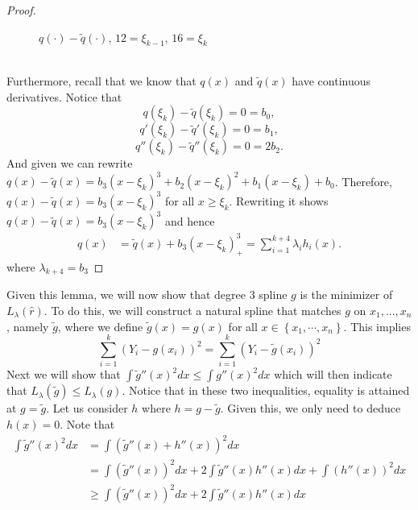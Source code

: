 \begin{proof}
\begin{figure}[!hb]
\begin{center}
			\caption{$q(\cdot) - \widetilde{q}(\cdot)$, $12= \xi_{k-1}$, $16 = \xi_k$}
			\label{fig:regression example}
		\end{center}
	\end{figure}
	\\Furthermore, recall that we know that $q(x)$ and $\widetilde{q}(x)$ have continuous derivatives. Notice that
	\[
	q(\xi_k) - \widetilde{q}(\xi_k) = 0 = b_0,
	\] \[
	q'(\xi_k) - \widetilde{q}'(\xi_k) = 0 = b_1, 
	\] \[
	q''(\xi_k) - \widetilde{q}''(\xi_k) = 0 = 2b_2.
	\]
	And given we can rewrite $q(x) - \widetilde{q}(x) = b_3(x-\xi_k)^3 + b_2(x-\xi_k)^2 + b_1(x-\xi_k) + b_0$. Therefore, $q(x) - \widetilde{q}(x) = b_3(x - \xi_k)^3$ for all $x \geq \xi_k$. Rewriting it shows $q(x) - \widetilde{q}(x) = b_3(x - \xi_k)^3$ and hence
	\begin{align*}
		q(x) &= \widetilde{q}(x) + b_3(x - \xi_k)_+^3 = \sum_{i=1}^{k+4}\lambda_ih_i(x).
	\end{align*}
	where $\lambda_{k+4} = b_3$
\end{proof} 
	Given this lemma, we will now show that degree $3$ spline $g$ is the minimizer of $L_\lambda(\hat{r})$. To do this, we will construct a natural spline that matches $g$ on $x_1, ..., x_n$, namely $\widetilde{g}$, where we define $\widetilde{g}(x) = g(x)$ for all $x \in \left\{x_1, \cdots, x_n\right\}$. This implies \[
	\sum_{i =1}^{k}(Y_i - g(x_i))^2 = \sum_{i =1}^{k}(Y_i - \widetilde{g}(x_i))^2  
	\]
	Next we will show that $\int \widetilde{g}''(x)^2dx \leq \int g''(x)^2dx$ which will then indicate that $L_\lambda(\widetilde{g}) \leq L_\lambda(g)$. Notice that in these two inequalities, equality is attained at $g = \widetilde{g}$.
	Let us consider $h$ where $h = g - \widetilde{g} $. Given this, we only need to deduce $h(x) = 0$. Note that 
	\begin{align*}
		\int \widetilde{g}''(x)^2dx &= \int (\widetilde{g}''(x) + h''(x))^2dx \\
		&= \int (\widetilde{g}''(x))^2dx + 2\int \widetilde{g}''(x) h''(x)dx + \int (h''(x))^2dx \\
		&\geq \int (\widetilde{g}''(x))^2dx + 2\int \widetilde{g}''(x) h''(x)dx
	\end{align*}
